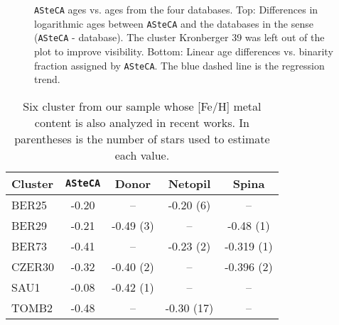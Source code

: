 \documentclass{aa}
\begin{document}
  \begin{figure}
   \caption{\texttt{ASteCA} ages vs. ages from the four databases.
   Top: Differences in logarithmic ages between \texttt{ASteCA} and
   the databases in the sense (\texttt{ASteCA} - database). The cluster
   Kronberger 39 was left out of the plot to improve visibility.
   Bottom: Linear age differences vs. binarity fraction assigned by
   \texttt{ASteCA}. The blue dashed line is the regression trend.}
   \label{fig:ages}
  \end{figure}


  \begin{table}
  \caption{Six cluster from our sample whose [Fe/H] metal content is also
  analyzed in recent works. In parentheses is the number of stars used to estimate
  each value.}
  \label{tab:metal}
  \centering
  \begin{tabular}{lcccc}
  \hline\hline
  Cluster & \texttt{ASteCA} & Donor & Netopil & Spina \\
  \hline %
   BER25  & -0.20  & --         & -0.20 (6)  & -- \\
   BER29  & -0.21  & -0.49 (3)  & --         & -0.48 (1)  \\
   BER73  & -0.41  & --         & -0.23 (2)  & -0.319 (1)  \\
   CZER30 & -0.32  & -0.40 (2)  & --         & -0.396 (2)  \\
   SAU1   & -0.08  & -0.42 (1)  & --         & --  \\
   TOMB2  & -0.48  & --         & -0.30 (17) & -- \\
  \hline
  \end{tabular}
  \end{table}
\end{document}

